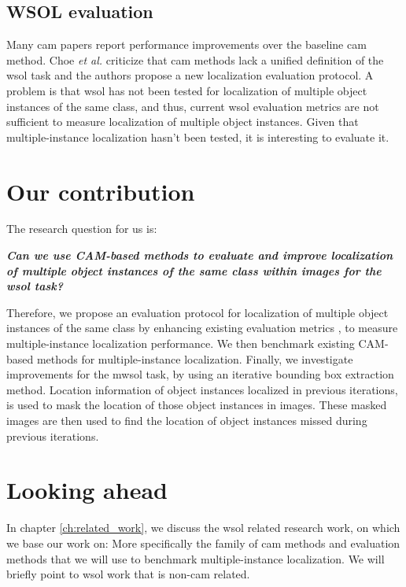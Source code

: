 \subsection{WSOL evaluation}
Many \acrshort{cam} papers report performance improvements over the baseline \acrshort{cam} method. Choe \textit{et al.} \cite{choe2020evaluating} criticize that \acrshort{cam} methods lack a unified definition of the \acrshort{wsol} task and the authors propose a new localization evaluation protocol. A problem is that \acrshort{wsol} has not been tested for localization of multiple object instances of the same class, and thus, current \acrshort{wsol} evaluation metrics are not sufficient to measure localization of multiple object instances. Given that multiple-instance localization hasn't been tested, it is interesting to evaluate it. 

\section{Our contribution}
The research question for us is:

\begin{center}
\textbf{\textit{Can we use CAM-based methods to evaluate and improve localization of multiple object instances of the same class within images for the \acrshort{wsol} task?}}
\end{center}

Therefore, we propose an evaluation protocol for localization of multiple object instances of the same class by enhancing existing evaluation metrics \cite{choe2020evaluating}, to measure multiple-instance localization performance.  We then benchmark existing CAM-based methods for multiple-instance localization. Finally, we investigate improvements for the \acrshort{mwsol} task, by using an iterative bounding box extraction method. Location information of object instances localized in previous iterations, is used to mask the location of those object instances in images. These masked images are then used to find the location of object instances missed during previous iterations.

\section{Looking ahead}
In chapter \ref{ch:related_work}, we discuss the \acrshort{wsol} related research work, on which we base our work on: More specifically the family of \acrshort{cam} methods and evaluation methods that we will use to benchmark multiple-instance localization. We will briefly point to \acrshort{wsol} work that is non-\acrshort{cam} related. 

